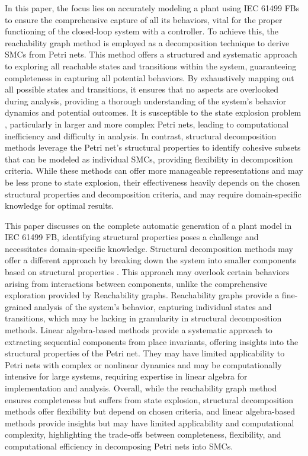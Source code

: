 \begin{bibunit}
In this paper, the focus lies on accurately modeling a plant using IEC 61499 FBs to ensure the comprehensive capture of all its behaviors, vital for the proper functioning of the closed-loop system with a controller. To achieve this, the reachability graph \cite{miyamoto2013modular, giua1994petri} method is employed as a decomposition technique to derive SMCs from Petri nets. This method offers a structured and systematic approach to exploring all reachable states and transitions within the system, guaranteeing completeness in capturing all potential behaviors. By exhaustively mapping out all possible states and transitions, it ensures that no aspects are overlooked during analysis, providing a thorough understanding of the system's behavior dynamics and potential outcomes. It is susceptible to the state explosion problem \cite{kungas2005petri,buchholz2002hierarchical}, particularly in larger and more complex Petri nets, leading to computational inefficiency and difficulty in analysis. In contrast, structural decomposition methods leverage the Petri net's structural properties \cite{wisniewski2019analysis} to identify cohesive subsets that can be modeled as individual SMCs, providing flexibility in decomposition criteria. While these methods can offer more manageable representations and may be less prone to state explosion, their effectiveness heavily depends on the chosen structural properties and decomposition criteria, and may require domain-specific knowledge for optimal results. 

This paper discusses on the complete automatic generation of a plant model in IEC 61499 FB, identifying structural properties poses a challenge and necessitates domain-specific knowledge. Structural decomposition methods may offer a different approach by breaking down the system into smaller components based on structural properties \cite{kiviriga2023efficient}. This approach may overlook certain behaviors arising from interactions between components, unlike the comprehensive exploration provided by Reachability graphs. Reachability graphs provide a fine-grained analysis of the system's behavior, capturing individual states and transitions, which may be lacking in granularity in structural decomposition methods. Linear algebra-based methods \cite{wisniewski2014theoretical} provide a systematic approach to extracting sequential components from place invariants, offering insights into the structural properties of the Petri net. They may have limited applicability to Petri nets with complex or nonlinear dynamics and may be computationally intensive for large systems, requiring expertise in linear algebra \cite{cai1995modeling, wisniewski2019decomposition} for implementation and analysis. Overall, while the reachability graph method ensures completeness but suffers from state explosion, structural decomposition methods offer flexibility but depend on chosen criteria, and linear algebra-based methods provide insights but may have limited applicability and computational complexity, highlighting the trade-offs between completeness, flexibility, and computational efficiency in decomposing Petri nets into SMCs. 


\end{bibunit}
